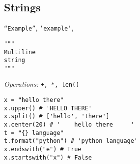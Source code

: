 \subsection{Strings}
\texttt{``Example''}, \texttt{'example'},
\begin{verbatim}
"""
Multiline
string
"""
\end{verbatim}
\textit{Operations:} \texttt{+, *, len()}
\begin{lstlisting}
x = "hello there"
x.upper() # 'HELLO THERE'
x.split() # ['hello', 'there']
x.center(20) # '    hello there     '
t = "{} language"
t.format("python") # 'python language'
x.endswith("e") # True
x.startswith("x") # False
\end{lstlisting}
